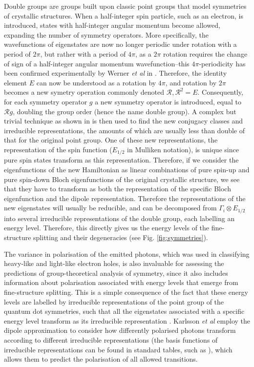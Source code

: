 \documentclass[12pt]{article}
\begin{document}
Double groups are groups built upon classic point groups that model symmetries of crystallic structures. When a half-integer spin particle, such as an electron, is introduced, states with half-integer angular momentum become allowed, expanding the number of symmetry operators. More specifically, the wavefunctions of eigenstates are now no longer periodic under rotation with a period of $2\pi$, but rather with a period of $4\pi$, as a $2\pi$ rotation requires the change of sign of a half-integer angular momentum wavefunction--this $4\pi$-periodicity has been confirmed experimentally by Werner \textit{et al} in \cite{fermion_periodicity}. Therefore, the identity element $E$ can now be understood as a rotation by $4\pi$, and rotation by $2\pi$ becomes a new symetry operation commonly denoted $\mathcal{R}, \mathcal{R}^2=E$. Consequently, for each symmetry operator $g$ a new symmetry operator is introduced, equal to $\mathcal{R}g$, doubling the group order (hence the name double group). A complex but trivial technique as shown in \cite{heine} is then used to find the new conjugacy classes and irreducible representations, the amounts of which are usually less than double of that for the original point group. One of these new representations, the representation of the spin function ($E_{1/2}$ in Mulliken notation), is unique since pure spin states transform as this representation. Therefore, if we consider the eigenfunctions of the new Hamiltonian as linear combinations of pure spin-up and pure spin-down Bloch eigenfunctions of the original crystallic structure, we see that they have to transform as both the representation of the specific Bloch eigenfunction and the dipole representation. Therefore the representations of the new eigenstates will usually be reducible, and can be decomposed from $\Gamma_i\otimes E_{1/2}$ into several irreducible representations of the double group, each labelling an energy level. Therefore, this directly gives us the energy levels of the fine-structure splitting and their degeneracies (see Fig. \ref{fig:symmetries}).

The variance in polarisation of the emitted photons, which was used in classifying heavy-like and light-like electron holes, is also invaluable for assessing the predictions of group-theoretical analysis of symmetry, since it also includes information about polarisation associated with energy levels that emerge from fine-structure splitting. This is a simple consequence of the fact that these energy levels are labelled by irreducible representations of the point group of the quantum dot symmetries, such that all the eigenstates associated with a specific energy level transform as its irreducible representation \cite[Ch. 5]{dresselhaus}. Karlsson \textit{et al} employ the dipole approximation to consider how differently polarised photons transform according to different irreducible representations (the basis functions of irreducible representations can be found in standard tables, such as \cite{altmann}), which allows them to predict the polarisation of all allowed transitions.
\end{document}
